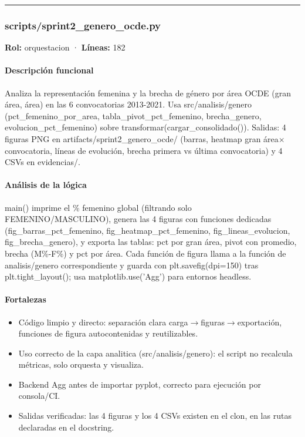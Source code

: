 \medskip
\hrule

\subsubsection{scripts/sprint2\_genero\_ocde.py}
\textbf{Rol:} orquestacion · \textbf{Líneas:} 182

\paragraph{Descripción funcional}
Analiza la representación femenina y la brecha de género por área OCDE (gran área, área) en las 6 convocatorias 2013-2021. Usa src/analisis/genero (pct\_femenino\_por\_area, tabla\_pivot\_pct\_femenino, brecha\_genero, evolucion\_pct\_femenino) sobre transformar(cargar\_consolidado()). Salidas: 4 figuras PNG en artifacts/sprint2\_genero\_ocde/ (barras, heatmap gran área$\times$convocatoria, líneas de evolución, brecha primera vs última convocatoria) y 4 CSVs en evidencias/.

\paragraph{Análisis de la lógica}
main() imprime el \% femenino global (filtrando solo FEMENINO/MASCULINO), genera las 4 figuras con funciones dedicadas (fig\_barras\_pct\_femenino, fig\_heatmap\_pct\_femenino, fig\_lineas\_evolucion, fig\_brecha\_genero), y exporta las tablas: pct por gran área, pivot con promedio, brecha (M\%-F\%) y pct por área. Cada función de figura llama a la función de analisis/genero correspondiente y guarda con plt.savefig(dpi=150) tras plt.tight\_layout(); usa matplotlib.use('Agg') para entornos headless.

\paragraph{Fortalezas}
\begin{itemize}
  \item Código limpio y directo: separación clara carga$\rightarrow$figuras$\rightarrow$exportación, funciones de figura autocontenidas y reutilizables.
  \item Uso correcto de la capa analitica (src/analisis/genero): el script no recalcula métricas, solo orquesta y visualiza.
  \item Backend Agg antes de importar pyplot, correcto para ejecución por consola/CI.
  \item Salidas verificadas: las 4 figuras y los 4 CSVs existen en el clon, en las rutas declaradas en el docstring.
\end{itemize}

